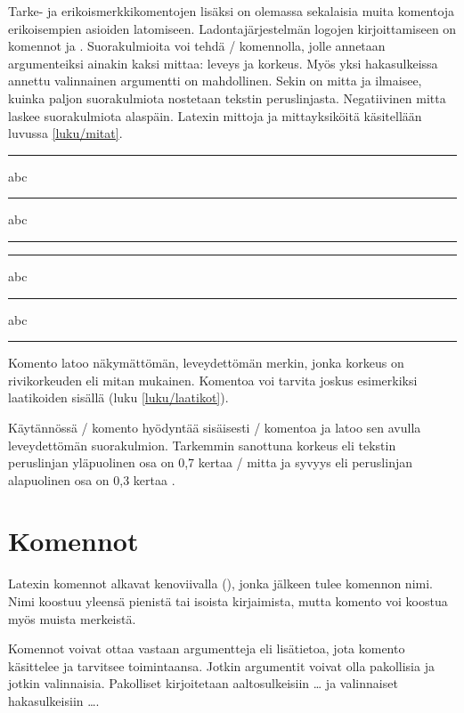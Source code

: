Tarke- ja erikoismerkkikomentojen lisäksi on olemassa sekalaisia muita
komentoja erikoisempien asioiden latomiseen. \marginaali{\TeX}
\marginaali{\LaTeX} Ladontajärjestelmän logojen kirjoittamiseen on
komennot  ja . Suorakulmioita voi tehdä
\-/ komennolla, jolle annetaan argumenteiksi ainakin kaksi
mittaa: leveys ja korkeus. Myös yksi hakasulkeissa annettu valinnainen
argumentti on mahdollinen. Sekin on mitta ja ilmaisee, kuinka paljon
suorakulmiota nostetaan tekstin peruslinjasta. Negatiivinen mitta laskee
suorakulmiota alaspäin. Latexin mittoja ja mittayksiköitä käsitellään
luvussa \ref{luku/mitat}.

\begin{koodilohkosis}
\rule{1ex}{1ex} abc \rule{3em}{.5bp} abc \rule[1ex]{3em}{.5bp}
\end{koodilohkosis}

\begin{tulossis}
  \rule{1ex}{1ex} abc \rule{3em}{.5bp} abc \rule[1ex]{3em}{.5bp}
\end{tulossis}

\noindent
Komento  latoo näkymättömän, leveydettömän merkin, jonka
korkeus on rivikorkeuden eli mitan  mukainen.
Komentoa voi tarvita joskus esimerkiksi laatikoiden sisällä (luku
\ref{luku/laatikot}).

Käytännössä \-/ komento hyödyntää sisäisesti
\-/ komentoa ja latoo sen avulla leveydettömän
suorakulmion. Tarkemmin sanottuna korkeus eli tekstin peruslinjan
yläpuolinen osa on 0,7 kertaa \-/ mitta ja syvyys
eli peruslinjan alapuolinen osa on 0,3 kertaa .

\begin{koodilohkosis}
\rule[-0.3\baselineskip]{0bp}{\baselineskip}
\end{koodilohkosis}

\section{Komennot}
\label{luku/komennot}

Latexin komennot alkavat kenoviivalla (\koodi{\textbackslash}), jonka
jälkeen tulee komennon nimi. Nimi koostuu yleensä pienistä tai isoista
kirjaimista, mutta komento voi koostua myös muista merkeistä.

Komennot voivat ottaa vastaan argumentteja eli lisätietoa, jota komento
käsittelee ja tarvitsee toimintaansa. Jotkin argumentit voivat olla
pakollisia ja jotkin valinnaisia. Pakolliset kirjoitetaan
aaltosulkeisiin \koodi{\{}\ldots\koodi{\}} ja valinnaiset hakasulkeisiin
\koodi{[}\ldots\koodi{]}.

